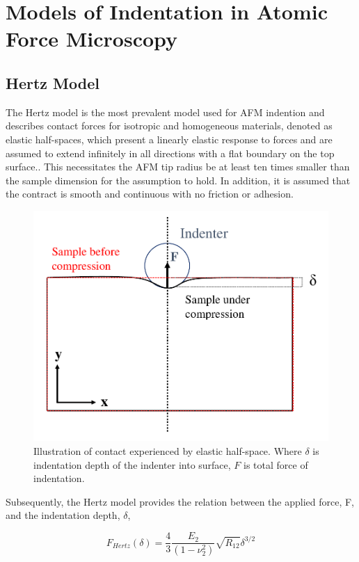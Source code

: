 \section{Models of Indentation in Atomic Force Microscopy \label{Appendix: Models of Indentation in Atomic Force Microscopy}}
\subsection{Hertz Model \label{Appendix: Hertz}}

The Hertz model is the most prevalent model used for AFM indention and describes contact forces for isotropic and homogeneous materials, denoted as elastic half-spaces, which present a linearly elastic response to forces\cite{kontomaris2019determination} and are assumed to extend infinitely in all directions with a flat boundary on the top surface.\cite{kontomaris2019harmonic}. This necessitates the AFM tip radius be at least ten times smaller than the sample dimension for the assumption to hold. In addition, it is assumed that the contract is smooth and continuous with no friction or adhesion\cite{kontomaris2019determination}.  

\begin{figure}[H]
    \centering
    \includegraphics[width=0.6\linewidth]{Figures/Hertz Contact.pdf}
    \caption{\label{fig: Hertz Contact} Illustration of contact experienced by elastic half-space.  Where $\delta$ is indentation depth of the indenter into surface, $F$ is total force of indentation.}
    
\end{figure}


Subsequently, the Hertz model provides the relation between the applied force, F, and the indentation depth, $\delta$, \cite{kontomaris2018hertz,kontomaris2020hertz}

\begin{equation} F_{Hertz}(\delta) =  \frac{4}{3} \frac{E_2}{(1-\nu_2^2)} \sqrt{R_{12}} \delta^{3/2} \label{eq: Hertz} \end{equation}

